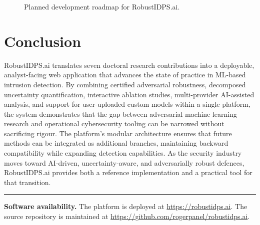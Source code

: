 \documentclass[11pt,a4paper]{article}
\begin{document}
\begin{figure}[H]
\centering
{}
\caption{Planned development roadmap for RobustIDPS.ai.}
\label{fig:roadmap}
\end{figure}

\section{Conclusion}

RobustIDPS.ai translates seven doctoral research contributions into a
deployable, analyst-facing web application that advances the state of
practice in ML-based intrusion detection. By combining certified
adversarial robustness, decomposed uncertainty quantification, interactive
ablation studies, multi-provider AI-assisted analysis, and support for
user-uploaded custom models within a single platform, the system
demonstrates that the gap between adversarial machine learning research
and operational cybersecurity tooling can be narrowed without sacrificing
rigour. The platform's modular architecture ensures that future methods
can be integrated as additional branches, maintaining backward
compatibility while expanding detection capabilities. As the security
industry moves toward AI-driven, uncertainty-aware, and adversarially
robust defences, RobustIDPS.ai provides both a reference implementation
and a practical tool for that transition.

\vspace{1em}
\hrule
\vspace{0.5em}
{\small
\textbf{Software availability.}
The platform is deployed at \url{https://robustidps.ai}. The source
repository is maintained at
\url{https://github.com/rogerpanel/robustidps.ai}.
}
\end{document}
